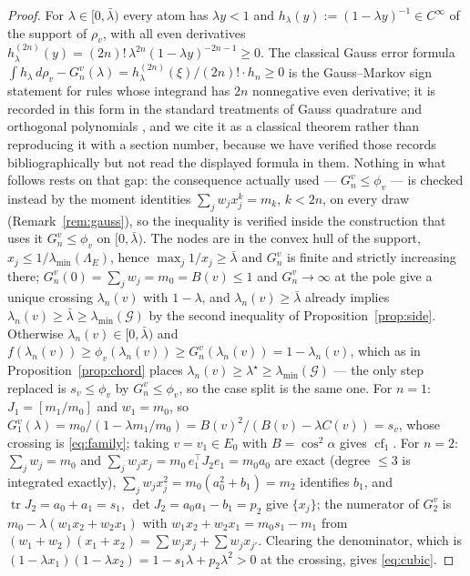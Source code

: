 \documentclass[11pt]{article}
\theoremstyle{remark}
\newcommand{\Gr}{\mathcal{G}}
\newcommand{\Le}{\Lambda_E}
\begin{document}
\begin{proof}
For $\lambda\in[0,\bar\lambda)$ every atom has $\lambda y<1$ and
$h_\lambda(y):=(1-\lambda y)^{-1}\in C^{\infty}$ of the support of $\rho_v$, with all even derivatives
$h_\lambda^{(2n)}(y)=(2n)!\,\lambda^{2n}(1-\lambda y)^{-2n-1}\ge0$. The classical Gauss error formula
$\int h_\lambda\,d\rho_v-G_n^v(\lambda)=h_\lambda^{(2n)}(\xi)/(2n)!\cdot h_n\ge0$ is the
Gauss--Markov sign statement for rules whose integrand has $2n$ nonnegative even derivative; it is
recorded in this form in the standard treatments of Gauss quadrature and orthogonal polynomials
\cite{gautschi1996,gautschi2004,szego1939}, and we cite it as a classical theorem rather than
reproducing it with a section number, because we have verified those records bibliographically but
not read the displayed formula in them. Nothing in what follows rests on that gap: the consequence
actually used --- $G_n^v\le\phi_v$ --- is checked instead by the moment identities
$\sum_jw_jx_j^k=m_k$, $k<2n$, on every draw (Remark~\ref{rem:gauss}), so the inequality is verified
inside the construction that uses it
$G_n^v\le\phi_v$ on $[0,\bar\lambda)$. The nodes are in the convex hull of the support,
$x_j\le1/\lambda_{\min}(\Le)$, hence $\max_j1/x_j\ge\bar\lambda$ and $G_n^v$ is finite and strictly
increasing there; $G_n^v(0)=\sum_jw_j=m_0=B(v)\le1$ and $G_n^v\to\infty$ at the pole give a unique
crossing $\lambda_n(v)$ with $1-\lambda$, and $\lambda_n(v)\ge\bar\lambda$ already implies
$\lambda_n(v)\ge\bar\lambda\ge\lambda_{\min}(\Gr)$ by the second inequality of
Proposition~\ref{prop:side}. Otherwise $\lambda_n(v)\in[0,\bar\lambda)$ and
$f(\lambda_n(v))\ge\phi_v(\lambda_n(v))\ge G_n^v(\lambda_n(v))=1-\lambda_n(v)$, which as in
Proposition~\ref{prop:chord} places $\lambda_n(v)\ge\lambda^{\star}\ge\lambda_{\min}(\Gr)$ --- the only
step replaced is $s_v\le\phi_v$ by $G_n^v\le\phi_v$, so the case split is the same one.
For $n=1$: $J_1=[m_1/m_0]$ and $w_1=m_0$, so
$G_1^v(\lambda)=m_0/(1-\lambda m_1/m_0)=B(v)^2/(B(v)-\lambda C(v))=s_v$, whose crossing is
\eqref{eq:family}; taking $v=v_1\in E_0$ with $B=\cos^2\alpha$ gives $\operatorname{cf}_1$.
For $n=2$: $\sum_jw_j=m_0$ and $\sum_jw_jx_j=m_0\,e_1^{\top}J_2e_1=m_0a_0$ are exact (degree $\le3$
is integrated exactly), $\sum_jw_jx_j^{2}=m_0(a_0^{2}+b_1)=m_2$ identifies $b_1$, and
$\operatorname{tr}J_2=a_0+a_1=s_1$, $\det J_2=a_0a_1-b_1=p_2$ give $\{x_j\}$; the numerator of $G_2^v$
is $m_0-\lambda(w_1x_2+w_2x_1)$ with $w_1x_2+w_2x_1=m_0s_1-m_1$ from
$(w_1+w_2)(x_1+x_2)=\sum w_jx_j+\sum w_jx_{j'}$. Clearing the denominator, which is
$(1-\lambda x_1)(1-\lambda x_2)=1-s_1\lambda+p_2\lambda^2>0$ at the crossing, gives \eqref{eq:cubic}.
\end{proof}
\end{document}
